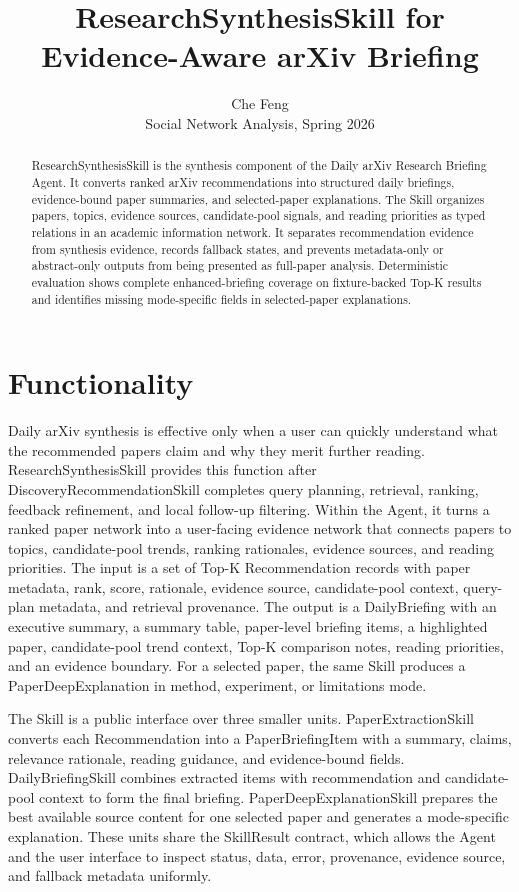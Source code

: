 \documentclass{article}
\title{ResearchSynthesisSkill for Evidence-Aware arXiv Briefing}
\author{%
  Che Feng \\
  Social Network Analysis, Spring 2026
}
\begin{document}
\maketitle

\begin{abstract}
ResearchSynthesisSkill is the synthesis component of the Daily arXiv Research Briefing Agent. It converts ranked arXiv recommendations into structured daily briefings, evidence-bound paper summaries, and selected-paper explanations. The Skill organizes papers, topics, evidence sources, candidate-pool signals, and reading priorities as typed relations in an academic information network. It separates recommendation evidence from synthesis evidence, records fallback states, and prevents metadata-only or abstract-only outputs from being presented as full-paper analysis. Deterministic evaluation shows complete enhanced-briefing coverage on fixture-backed Top-K results and identifies missing mode-specific fields in selected-paper explanations.
\end{abstract}

\section{Functionality}

Daily arXiv synthesis is effective only when a user can quickly understand what the recommended papers claim and why they merit further reading. ResearchSynthesisSkill provides this function after DiscoveryRecommendationSkill completes query planning, retrieval, ranking, feedback refinement, and local follow-up filtering. Within the Agent, it turns a ranked paper network into a user-facing evidence network that connects papers to topics, candidate-pool trends, ranking rationales, evidence sources, and reading priorities. The input is a set of Top-K Recommendation records with paper metadata, rank, score, rationale, evidence source, candidate-pool context, query-plan metadata, and retrieval provenance. The output is a DailyBriefing with an executive summary, a summary table, paper-level briefing items, a highlighted paper, candidate-pool trend context, Top-K comparison notes, reading priorities, and an evidence boundary. For a selected paper, the same Skill produces a PaperDeepExplanation in method, experiment, or limitations mode.

The Skill is a public interface over three smaller units. PaperExtractionSkill converts each Recommendation into a PaperBriefingItem with a summary, claims, relevance rationale, reading guidance, and evidence-bound fields. DailyBriefingSkill combines extracted items with recommendation and candidate-pool context to form the final briefing. PaperDeepExplanationSkill prepares the best available source content for one selected paper and generates a mode-specific explanation. These units share the SkillResult contract, which allows the Agent and the user interface to inspect status, data, error, provenance, evidence source, and fallback metadata uniformly.
\end{document}
